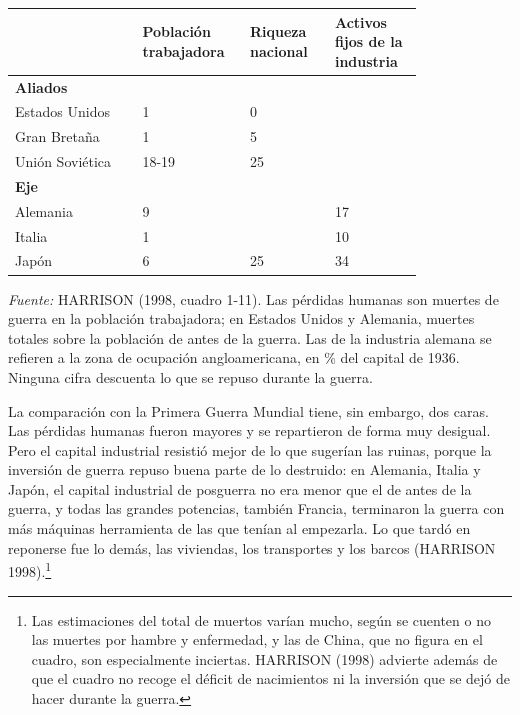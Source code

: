 \documentclass[10pt,a4paper]{article}
\begin{document}
\begin{center}\begin{minipage}{\linewidth}\par\vspace{0.3em}
{\footnotesize
\begin{tabular}{|p{0.27\linewidth}|p{0.18\linewidth}|p{0.18\linewidth}|p{0.18\linewidth}|}
\hline
 & \textbf{Población trabajadora} & \textbf{Riqueza nacional} & \textbf{Activos fijos de la industria} \\
\hline
\textbf{Aliados} & & & \\
Estados Unidos & \hfill 1 & \hfill 0 & \\
Gran Bretaña & \hfill 1 & \hfill 5 & \\
Unión Soviética & \hfill 18-19 & \hfill 25 & \\
\hline
\textbf{Eje} & & & \\
Alemania & \hfill 9 & & \hfill 17 \\
Italia & \hfill 1 & & \hfill 10 \\
Japón & \hfill 6 & \hfill 25 & \hfill 34 \\
\hline
\end{tabular}}\par\vspace{0.3em} {\small\textit{Fuente: }HARRISON (1998, cuadro 1-11). Las pérdidas humanas son muertes de guerra en la población trabajadora; en Estados Unidos y Alemania, muertes totales sobre la población de antes de la guerra. Las de la industria alemana se refieren a la zona de ocupación angloamericana, en \% del capital de 1936. Ninguna cifra descuenta lo que se repuso durante la guerra.}\end{minipage}\end{center}

La comparación con la Primera Guerra Mundial tiene, sin embargo, dos caras. Las pérdidas humanas fueron mayores y se repartieron de forma muy desigual. Pero el capital industrial resistió mejor de lo que sugerían las ruinas, porque la inversión de guerra repuso buena parte de lo destruido: en Alemania, Italia y Japón, el capital industrial de posguerra no era menor que el de antes de la guerra, y todas las grandes potencias, también Francia, terminaron la guerra con más máquinas herramienta de las que tenían al empezarla. Lo que tardó en reponerse fue lo demás, las viviendas, los transportes y los barcos (HARRISON 1998).\footnote{%
    Las estimaciones del total de muertos varían mucho, según se cuenten o no las muertes por hambre y enfermedad, y las de China, que no figura en el cuadro, son especialmente inciertas. HARRISON (1998) advierte además de que el cuadro no recoge el déficit de nacimientos ni la inversión que se dejó de hacer durante la guerra.
}
\end{document}
